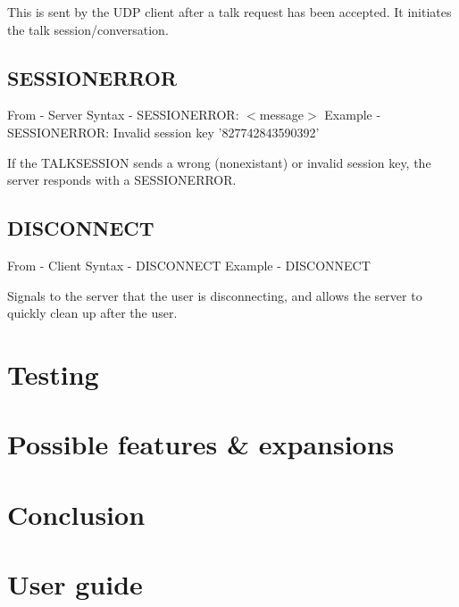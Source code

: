 \documentclass[12pt]{rapport}
\begin{document}
\noindent This is sent by the UDP client after a talk request has been accepted. It initiates the talk session/conversation.

\subsection*{SESSIONERROR}
From    - Server\newline
Syntax  - SESSIONERROR: $<$message$>$\newline
Example - SESSIONERROR: Invalid session key '827742843590392'\newline

\noindent If the TALKSESSION sends a wrong (nonexistant) or invalid session key, the server responds with a SESSIONERROR.

\subsection*{DISCONNECT}
From    - Client\newline
Syntax  - DISCONNECT\newline
Example - DISCONNECT\newline

\noindent Signals to the server that the user is disconnecting, and allows the server to quickly clean up after the user.


\section*{Testing}



\section*{Possible features \& expansions}



\newpage
\section*{Conclusion}




\newpage
\section*{User guide}
\end{document}
